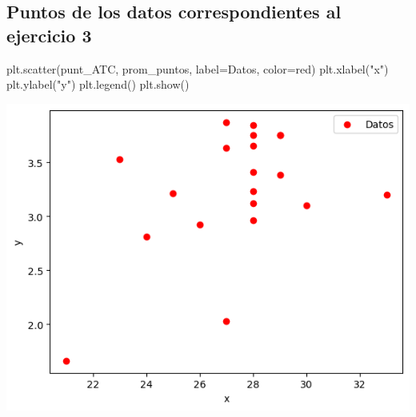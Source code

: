 \documentclass[
  letterpaper,
  DIV=11,
  numbers=noendperiod]{scrartcl}
\newenvironment{Shaded}{\begin{snugshade}}{\end{snugshade}}
\newcommand{\NormalTok}[1]{\textcolor[rgb]{0.00,0.23,0.31}{#1}}
\newcommand{\OperatorTok}[1]{\textcolor[rgb]{0.37,0.37,0.37}{#1}}
\newcommand{\StringTok}[1]{\textcolor[rgb]{0.13,0.47,0.30}{#1}}
\begin{document}
\subsection{Puntos de los datos correspondientes al ejercicio
3}\label{puntos-de-los-datos-correspondientes-al-ejercicio-3}

\begin{Shaded}
\begin{Highlighting}[]

\NormalTok{plt.scatter(punt\_ATC, prom\_puntos, label}\OperatorTok{=}\StringTok{\textquotesingle{}Datos\textquotesingle{}}\NormalTok{, color}\OperatorTok{=}\StringTok{\textquotesingle{}red\textquotesingle{}}\NormalTok{)}
\NormalTok{plt.xlabel(}\StringTok{"x"}\NormalTok{)}
\NormalTok{plt.ylabel(}\StringTok{"y"}\NormalTok{)}
\NormalTok{plt.legend()}
\NormalTok{plt.show()}
\end{Highlighting}
\end{Shaded}

\includegraphics{Tarea8_MN_files/figure-pdf/cell-16-output-1.png}
\end{document}
